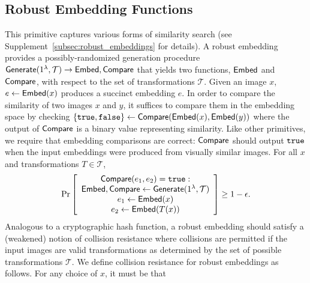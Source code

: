 \documentclass[12pt]{article}
\begin{document}
\subsection{Robust Embedding Functions} 
This primitive captures various forms of similarity search (see Supplement~\ref{subsec:robust_embeddings} for details).
A robust embedding provides a possibly-randomized generation procedure $\mathsf{Generate}(1^\lambda, \mathcal{T}) \to \mathsf{Embed}, \mathsf{Compare}$ that yields two functions, $\mathsf{Embed}$ and $\mathsf{Compare}$, with respect to the set of transformations $\mathcal{T}$.
Given an image $x$, $e \gets \mathsf{Embed}(x)$ produces a succinct embedding $e$.
In order to compare the similarity of two images $x$ and $y$, it suffices to compare them in the embedding space by checking $\{\mathtt{true},\mathtt{false}\} \gets \mathsf{Compare}(\mathsf{Embed}(x), \mathsf{Embed}(y))$ where the output of $\mathsf{Compare}$ is a binary value representing similarity.
Like other primitives, we require that embedding comparisons are correct: $\mathsf{Compare}$ should output $\mathtt{true}$ when the input embeddings were produced from visually similar images.
For all $x$ and transformations $T \in \mathcal{T}$,
\begin{align*}
    \Pr\left[
    \begin{array}{ccc}
        \begin{matrix}
            \mathsf{Compare}(e_1, e_2) = \mathtt{true} : \\
            \mathsf{Embed}, \mathsf{Compare} \gets \mathsf{Generate}(1^\lambda, \mathcal{T}) \\
            e_1 \gets \mathsf{Embed}(x) \\
            e_2 \gets \mathsf{Embed}(T(x)) \\
        \end{matrix} \\
    \end{array}
    \right] \geq 1 - \epsilon.
\end{align*}
Analogous to a cryptographic hash function, a robust embedding should satisfy a (weakened) notion of collision resistance where collisions are permitted if the input images are valid transformations as determined by the set of possible transformations $\mathcal{T}$.
We define collision resistance for robust embeddings as follows.
For any choice of $x$, it must be that
\end{document}
